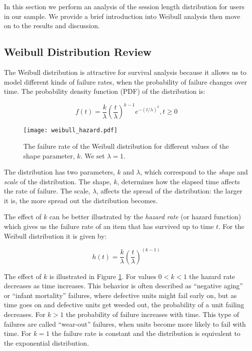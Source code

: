 %

In this section we perform an analysis of the session length distribution
for users in our sample. We provide a brief introduction into Weibull analysis
then move on to the results and discussion.

\subsection{Weibull Distribution Review}

\label{subsec:weibull-review}

The Weibull distribution is attractive for
survival analysis because it allows us to model different kinds of failure rates,
when the probability of failure changes over time. The probability
density function (PDF) of the distribution is:

\begin{equation}
    \label{eq:weibull-pdf}
    f(t) = \frac{k}{\lambda}\left( \frac{t}{\lambda}\right)^{k-1}e^{-(t/\lambda)^k}, t \geq 0
\end{equation}


\begin{figure}
    \centering
    \texttt{[image: weibull\_hazard.pdf]}
    \caption{The failure rate of the Weibull distribution for different values of the shape parameter, $k$. We set $\lambda = 1$.}
    \label{fig:weibull-failure-rate}
\end{figure}

The distribution has two parameters, $k$ and $\lambda$, which correspond to the \textit{shape}
and \textit{scale} of the distribution. The shape, $k$, determines how the elapsed
time affects the rate of failure. The scale, $\lambda$, affects the spread of
the distribution: the larger it is, the more spread out the distribution becomes.

The effect of $k$ can be better illustrated by the \textit{hazard rate} (or hazard function) which gives us the
failure rate of an item that has survived up to time $t$.
For the Weibull distribution it is given by:

\begin{equation}
    \label{eq:weibull-failure-rate}
    h(t) = \frac{k}{\lambda}\left( \frac{t}{\lambda}\right)^{(k - 1)}
\end{equation}

The effect of $k$ is illustrated in Figure \ref{fig:weibull-failure-rate}.
For values $0 < k < 1$ the hazard rate decreases as time increases. This behavior is
often described as ``negative aging'' or ``infant mortality'' failures, where defective units might 
fail early on, but as time goes on and defective units get weeded out, the probability
of a unit failing decreases. 
For $k > 1$ the probability of failure increases with time. This type of failures are 
called ``wear-out'' failures, when units become more likely
to fail with time. For $k = 1$ the failure rate is constant and the distribution
is equivalent to the exponential distribution.


